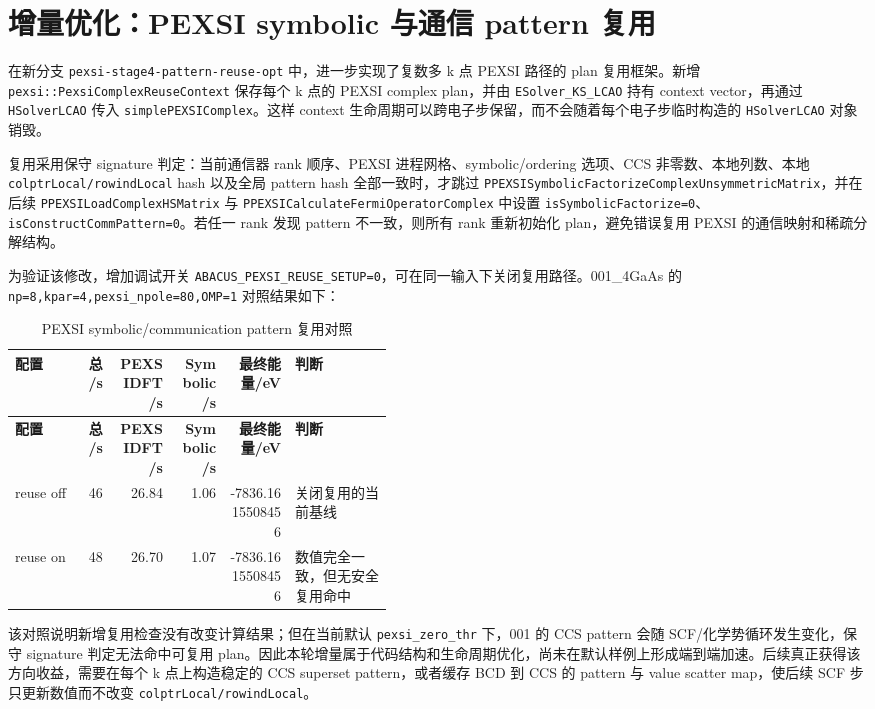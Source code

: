 \documentclass[a4paper,11pt]{article}
\newcommand{\code}[1]{\texttt{#1}}
\begin{document}
\section{增量优化：PEXSI symbolic 与通信 pattern 复用}

在新分支 \code{pexsi-stage4-pattern-reuse-opt} 中，进一步实现了复数多 k 点 PEXSI 路径的 plan 复用框架。新增 \code{pexsi::PexsiComplexReuseContext} 保存每个 k 点的 PEXSI complex plan，并由 \code{ESolver\_KS\_LCAO} 持有 context vector，再通过 \code{HSolverLCAO} 传入 \code{simplePEXSIComplex}。这样 context 生命周期可以跨电子步保留，而不会随着每个电子步临时构造的 \code{HSolverLCAO} 对象销毁。

复用采用保守 signature 判定：当前通信器 rank 顺序、PEXSI 进程网格、symbolic/ordering 选项、CCS 非零数、本地列数、本地 \code{colptrLocal/rowindLocal} hash 以及全局 pattern hash 全部一致时，才跳过 \code{PPEXSISymbolicFactorizeComplexUnsymmetricMatrix}，并在后续 \code{PPEXSILoadComplexHSMatrix} 与 \code{PPEXSICalculateFermiOperatorComplex} 中设置 \code{isSymbolicFactorize=0}、\code{isConstructCommPattern=0}。若任一 rank 发现 pattern 不一致，则所有 rank 重新初始化 plan，避免错误复用 PEXSI 的通信映射和稀疏分解结构。

为验证该修改，增加调试开关 \code{ABACUS\_PEXSI\_REUSE\_SETUP=0}，可在同一输入下关闭复用路径。001\_4GaAs 的 \code{np=8,kpar=4,pexsi\_npole=80,OMP=1} 对照结果如下：

{\scriptsize
\begin{longtable}{@{}p{0.18\linewidth}r r r r p{0.26\linewidth}@{}}
\caption{PEXSI symbolic/communication pattern 复用对照}\\
\toprule
\textbf{配置} & \textbf{总/s} & \textbf{PEXSIDFT/s} & \textbf{Symbolic/s} & \textbf{最终能量/eV} & \textbf{判断}\\
\midrule
\endfirsthead
\toprule
\textbf{配置} & \textbf{总/s} & \textbf{PEXSIDFT/s} & \textbf{Symbolic/s} & \textbf{最终能量/eV} & \textbf{判断}\\
\midrule
\endhead
reuse off & 46 & 26.84 & 1.06 & -7836.1615508456 & 关闭复用的当前基线\\
reuse on & 48 & 26.70 & 1.07 & -7836.1615508456 & 数值完全一致，但无安全复用命中\\
\bottomrule
\end{longtable}
}

该对照说明新增复用检查没有改变计算结果；但在当前默认 \code{pexsi\_zero\_thr} 下，001 的 CCS pattern 会随 SCF/化学势循环发生变化，保守 signature 判定无法命中可复用 plan。因此本轮增量属于代码结构和生命周期优化，尚未在默认样例上形成端到端加速。后续真正获得该方向收益，需要在每个 k 点上构造稳定的 CCS superset pattern，或者缓存 BCD 到 CCS 的 pattern 与 value scatter map，使后续 SCF 步只更新数值而不改变 \code{colptrLocal/rowindLocal}。
\end{document}

